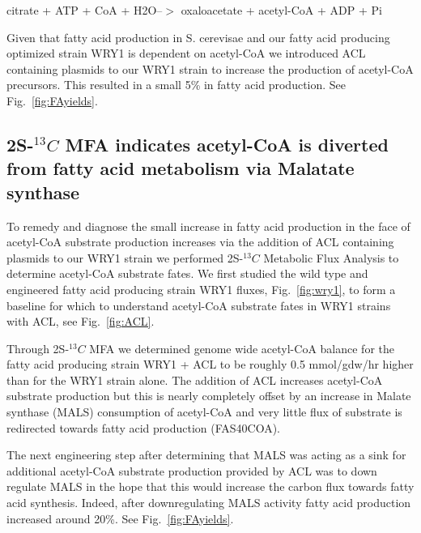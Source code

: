 \documentclass{bmcart}
\begin{document}
citrate + ATP + CoA + H2O--$>$ oxaloacetate + acetyl-CoA + ADP + Pi

Given that fatty acid production in S. cerevisae and our fatty acid producing optimized strain WRY1 is dependent on acetyl-CoA we introduced ACL containing plasmids to our WRY1 strain to increase the production of acetyl-CoA precursors. This resulted in a small 5\% in fatty acid production. See Fig.~\ref{fig:FAyields}.

\subsection*{2S-$^{13}C$ MFA indicates acetyl-CoA is diverted from fatty acid metabolism via Malatate synthase}
To remedy and diagnose the small increase in fatty acid production in the face of acetyl-CoA substrate production increases via the addition of ACL containing plasmids to our WRY1 strain we performed 2S-$^{13}C$ Metabolic Flux Analysis to determine acetyl-CoA substrate fates. We first studied the wild type and engineered fatty acid producing strain WRY1 fluxes, Fig.~\ref{fig:wry1}, to form a baseline for which to understand acetyl-CoA substrate fates in WRY1 strains with ACL, see Fig.~\ref{fig:ACL}.

Through 2S-$^{13}C$ MFA we determined genome wide acetyl-CoA balance for the fatty acid producing strain  WRY1 + ACL to be roughly 0.5 mmol/gdw/hr higher than for the WRY1 strain alone. The addition of ACL increases acetyl-CoA substrate production but this is nearly completely offset by an increase in Malate synthase (MALS) consumption of acetyl-CoA and very little flux of substrate is redirected towards fatty acid production (FAS40COA).

The next engineering step after determining that MALS was acting as a sink for additional acetyl-CoA substrate production provided by ACL was to down regulate MALS in the hope that this would increase the carbon flux towards fatty acid synthesis. Indeed, after downregulating MALS activity fatty acid production increased around 20\%. See Fig.~\ref{fig:FAyields}.
\end{document}
